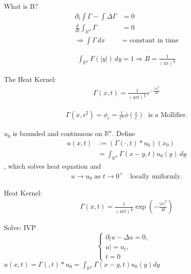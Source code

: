 \documentclass[11pt]{article}
\begin{document}
What is B?
\begin{align*}
    \partial_{t}\int \Gamma - \int\Delta\Gamma &= 0\\
    \frac{d}{dt}\int_{\mathbb{R}^{n}}\Gamma &= 0 \\
    \Longrightarrow \int\Gamma \,dx &= \text{ constant in time}
\end{align*}

\begin{align*}
    \int_{\mathbb{R}^{n}}F(|y|)\,dy = 1 \Longrightarrow   B = \frac{1}{(4\pi)^{\frac{n}{2}}}
\end{align*}

The Heat Kernel:
\begin{align*}
    \Gamma(x,t) = \frac{1}{(4\pi t)^{\frac{n}{2}}}e^{-\frac{|x|^{2}}{4t}}
\end{align*}

\begin{align*}
    \Gamma(x,\epsilon^{2}) = \phi_{\epsilon} = \frac{1}{\epsilon^{n}}\phi(\frac{x}{\epsilon})
    \; \text{ is a Mollifier.}
\end{align*}

\begin{theorem}
    $u_0$ is bounded and continuous on $\mathbb{R}^{n}$. Define 
    \begin{align*}
        u(x,t) &:= (\Gamma(\cdot , t) * u_0)(x_0) \\
        &= \int_{\mathbb{R}^{n}}\Gamma(x-y, t)u_0(y)\,dy 
    \end{align*}
    , which solves heat equation and 
    \begin{align*}
        u \longrightarrow u_0 \text{ as  }t \longrightarrow 0^{+} \quad \text{locally uniformly.}
    \end{align*}
\end{theorem}



Heat Kernel:
\begin{align*}
    \Gamma (x,t) = \frac{1}{(4\pi t)^{\frac{n}{2}}} \exp(-\frac{|x|^{2}}{4t})
\end{align*}

Solve: IVP
\begin{equation}
    \begin{cases} 
    \partial_{t} u - \Delta u = 0, &  \\ 
    u| = u_t, &   \\
    t = 0
    \end{cases}
\end{equation}
$u(x,t) = \Gamma(,t)\ast u_{0} = \int _{\mathbb{R}^{n}}\Gamma(x-y,t)u_0(y)dy$
\end{document}
